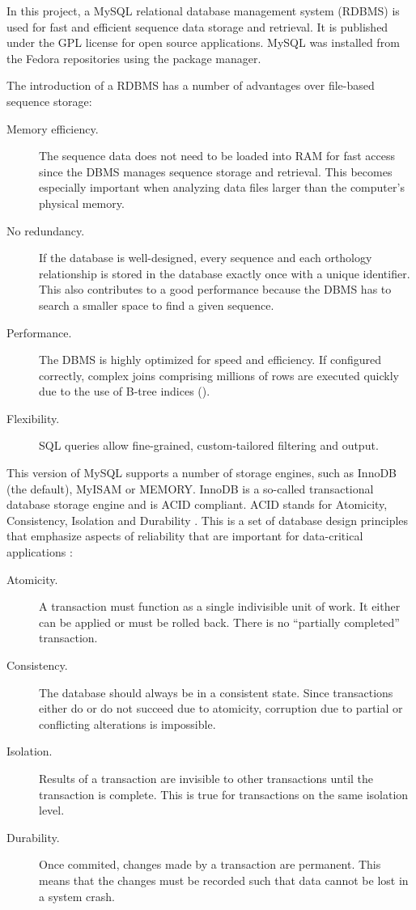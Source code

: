 In this project, a MySQL relational database management system (RDBMS) is used
for fast and efficient sequence data storage and retrieval. It is published
under the GPL license for open source applications. MySQL was installed from the
Fedora repositories using the package manager.

The introduction of a RDBMS has a number of advantages over file-based sequence
storage:

\begin{description}
	\item[Memory efficiency.] The sequence data does not need to be loaded into
		RAM for fast access since the DBMS manages sequence storage and retrieval.
		This becomes especially important when analyzing data files larger than the
		computer's physical memory.
	\item[No redundancy.] If the database is well-designed, every sequence and
		each orthology relationship is stored in the database exactly once with a
		unique identifier. This also contributes to a good performance because the
		DBMS has to search a smaller space to find a given sequence.
	\item[Performance.] The DBMS is highly optimized for speed and efficiency. If
		configured correctly, complex joins comprising millions of rows are executed
		quickly due to the use of B-tree indices (\cite{comer1979}).
	\item[Flexibility.] SQL queries allow fine-grained, custom-tailored filtering
		and output.
\end{description}

This version of MySQL supports a number of storage engines, such as InnoDB (the
default), MyISAM or MEMORY. InnoDB is a so-called transactional database storage
engine and is ACID compliant. ACID stands for Atomicity, Consistency, Isolation
and Durability \citep{haerder1983}. This is a set of database design principles
that emphasize aspects of reliability that are important for data-critical
applications \citep{balling2005}:

\begin{description}
	\item[Atomicity.] A transaction must function as a single indivisible unit of
		work. It either can be applied or must be rolled back. There is no
		``partially completed'' transaction.
	\item[Consistency.] The database should always be in a consistent state. Since
		transactions either do or do not succeed due to atomicity, corruption due to
		partial or conflicting alterations is impossible.
	\item[Isolation.] Results of a transaction are invisible to other
		transactions until the transaction is complete. This is true for
		transactions on the same isolation level.
	\item[Durability.] Once commited, changes made by a transaction are permanent.
		This means that the changes must be recorded such that data cannot be lost
		in a system crash. 
\end{description}


